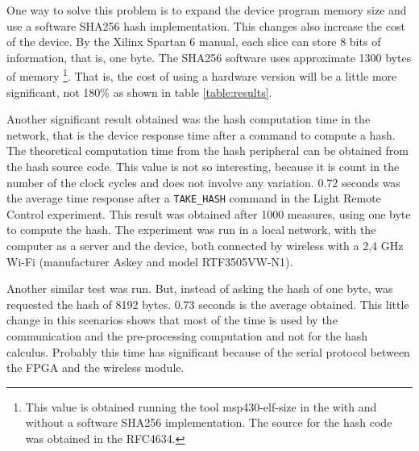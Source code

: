 One way to solve this problem is to expand the device program memory size and use a software SHA256 hash implementation.  This changes also increase the cost of the device. By the Xilinx Spartan 6 manual, each slice can store 8 bits of information, that is, one byte. The SHA256 software uses approximate 1300 bytes of memory \footnote{This value is obtained running the tool msp430-elf-size in the with and without a software SHA256 implementation. The source for the hash code was obtained in the RFC4634.}. That is, the cost of using a hardware version will be a little more significant, not 180\% as shown in table \ref{table:results}.

Another significant result obtained was the hash computation time in the network, that is the device response time after a command to compute a hash. The theoretical computation time from the hash peripheral can be obtained from the hash source code. This value is not so interesting, because it is count in the number of the clock cycles and does not involve any variation.  0.72 seconds was the average time response after a \verb|TAKE_HASH| command in the Light Remote Control experiment. This result was obtained after 1000 measures, using one byte to compute the hash. The experiment was run in a local network, with the computer as a server and the device, both connected by wireless with a 2,4 GHz Wi-Fi  (manufacturer Askey  and model RTF3505VW-N1).

Another similar test was run. But, instead of asking the hash of one byte, was requested the hash of  8192 bytes. 0.73 seconds is the average obtained.  This little change in this scenarios shows that most of the time is used by the communication and the pre-processing computation and not for the hash calculus. Probably this time has significant because of the serial protocol between the FPGA and the wireless module.

